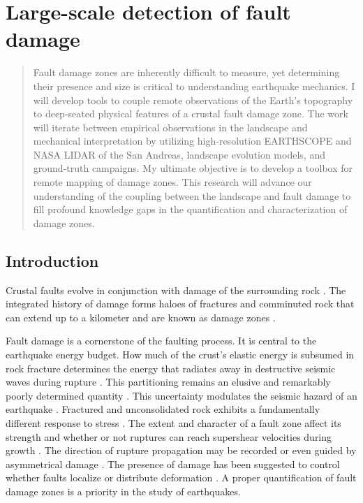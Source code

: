 \documentclass[12pt, notitlepage]{report}
\begin{document}

\chapter{Large-scale detection of fault damage}\label{cpt:damage}

\begin{abstract}

Fault damage zones are inherently difficult to measure, yet determining their presence and size is critical to understanding earthquake mechanics. I will develop tools to couple remote observations of the Earth's topography to deep-seated physical features of a crustal fault damage zone. The work will iterate between empirical observations in the landscape and mechanical interpretation by utilizing high-resolution EARTHSCOPE and NASA LIDAR of the San Andreas, landscape evolution models, and ground-truth campaigns. My ultimate objective is to develop a toolbox for remote mapping of damage zones. This research will advance our understanding of the coupling between the landscape and fault damage to fill profound knowledge gaps in the quantification and characterization of damage zones.

\end{abstract}

\section{Introduction}

Crustal faults evolve in conjunction with damage of the surrounding rock \cite{caine1996fault, mitchell2009nature, Faulkner2008OnFaults}. The integrated history of damage forms haloes of fractures and comminuted rock that can extend up to a kilometer and are known as damage zones \cite{caine1996fault,Ben-zion2003}.

Fault damage is a cornerstone of the faulting process. It is central to the earthquake energy budget. How much of the crust's elastic energy is subsumed in rock fracture determines the energy that radiates away in destructive seismic waves during rupture \cite{Kanamori2006EnergyEarthquake}. This partitioning remains an elusive and remarkably poorly determined quantity \cite{Chester2005FractureSystem,shipton2006missing}. This uncertainty modulates the seismic hazard of an earthquake  \cite{Abercrombie2005, Kanamori2006EnergyEarthquake}. Fractured and unconsolidated rock exhibits a fundamentally different response to stress \cite{Faulkner2006SlipZone}. The extent and character of a fault zone affect its strength \cite{Faulkner2006SlipZone} and whether or not ruptures can reach supershear velocities during growth \cite{Huang2016TheObservations}. The direction of rupture propagation may be recorded or even guided by asymmetrical damage \cite{DorGeologicalDirection}. The presence of damage has been suggested to control whether faults localize or distribute deformation \cite{Milliner2015QuantifyingEarthquake}. A proper quantification of fault damage zones is a priority in the study of earthquakes.
\end{document}
